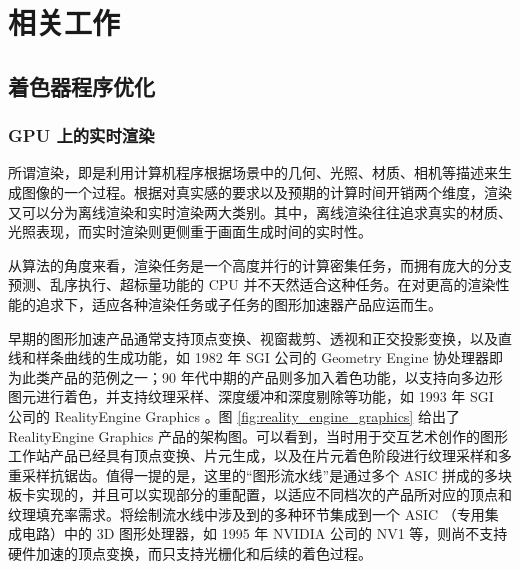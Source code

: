 
\chapter{相关工作}

\section{着色器程序优化}

\subsection{GPU 上的实时渲染}

\label{sec:realtime_rendering_in_gpu}

所谓渲染，即是利用计算机程序根据场景中的几何、光照、材质、相机等描述来生成图像的一个过程。根据对真实感的要求以及预期的计算时间开销两个维度，渲染又可以分为离线渲染和实时渲染两大类别。其中，离线渲染往往追求真实的材质、光照表现，而实时渲染则更侧重于画面生成时间的实时性。


从算法的角度来看，渲染任务是一个高度并行的计算密集任务，而拥有庞大的分支预测、乱序执行、超标量功能的 CPU 并不天然适合这种任务。在对更高的渲染性能的追求下，适应各种渲染任务或子任务的图形加速器产品应运而生。

早期的图形加速产品通常支持顶点变换、视窗裁剪、透视和正交投影变换，以及直线和样条曲线的生成功能，如 1982 年 SGI 公司的 Geometry Engine \cite{GeometryEngineSGI} 协处理器即为此类产品的范例之一；90 年代中期的产品则多加入着色功能，以支持向多边形图元进行着色，并支持纹理采样、深度缓冲和深度剔除等功能，如 1993 年 SGI 公司的 RealityEngine Graphics \cite{RealityEngineSGI}。图 \ref{fig:reality_engine_graphics} 给出了 RealityEngine Graphics 产品的架构图。可以看到，当时用于交互艺术创作的图形工作站产品已经具有顶点变换、片元生成，以及在片元着色阶段进行纹理采样和多重采样抗锯齿。值得一提的是，这里的“图形流水线”是通过多个 ASIC 拼成的多块板卡实现的，并且可以实现部分的重配置，以适应不同档次的产品所对应的顶点和纹理填充率需求。将绘制流水线中涉及到的多种环节集成到一个 ASIC （专用集成电路）中的 3D 图形处理器，如 1995 年 NVIDIA 公司的 NV1 \cite{NV1NVIDIA, NV1NVIDIANews} 等，则尚不支持硬件加速的顶点变换，而只支持光栅化和后续的着色过程。

